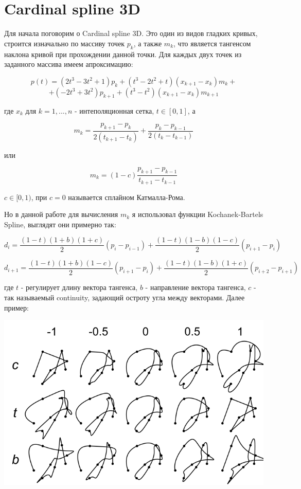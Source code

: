 \section{Cardinal spline 3D}

Для начала поговорим о Cardinal spline 3D. Это один из видов гладких кривых, строится изначально по массиву точек $p_k$, а также $m_k$, что является тангенсом наклона кривой при прохождении данной точки. Для каждых двух точек из заданного массива имеем апроксимацию:

$$
p(t) = (2t^3 - 3t^2 + 1)p_k + (t^3 - 2t^2 + t)(x_{k+1} - x_k)m_k + 
$$
$$
+ (-2t^3 + 3t^2)p_{k+1} + (t^3 - t^2)(x_{k+1} - x_k)m_{k+1}
$$

где $x_k$ для $k = 1, ... , n$ - интеполяционная сетка, $t \in [0,1]$, а

$$
m_k = \dfrac{p_{k+1} - p_k}{2(t_{k+1} - t_k)} + \dfrac{p_{k} - p_{k-1}}{2(t_{k} - t_{k-1})}
$$

или

$$
m_k = (1-c) \dfrac{p_{k+1} - p_{k-1}}{t_{k+1} - t_{k-1}}
$$

$c \in [0,1)$, при $c=0$ называется сплайном Катмалла-Рома. 

Но в данной работе для вычисления $m_k$ я использовал функции Kochanek-Bartels Spline, выглядят они примерно так:

$$
d_i = \dfrac{(1-t)(1+b)(1+c)}{2} (p_i - p_{i-1}) + \dfrac{(1-t)(1-b)(1-c)}{2} (p_{i+1} - p_i)
$$

$$
d_{i+1} = \dfrac{(1-t)(1+b)(1-c)}{2} (p_{i+1} - p_{i}) + \dfrac{(1-t)(1-b)(1+c)}{2} (p_{i+2} - p_{i+1})
$$

где $t$ - регулирует длину вектора тангенса, $b$ - направление вектора тангенса, $c$ - так называемый continuity, задающий остроту угла между векторами. Далее пример:

\includegraphics[scale=0.45]{pictures/4.png}


